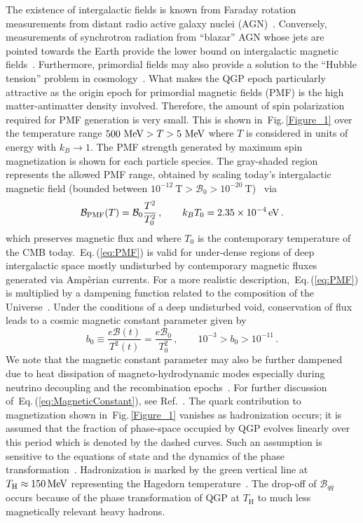 \documentclass[epjST]{svjour}
\newcommand*{\MeV}{\text{\,MeV}}
\newcommand*{\eV}{\text{\,eV}}
\newcommand{\req}[1]{Eq.\,(\ref{#1})}
\newcommand{\rf}[1]{Fig.\,{\ref{#1}}}
\begin{document}
{\color{blue} The existence of intergalactic fields is known from Faraday rotation measurements from distant radio active galaxy nuclei (AGN)~\cite{Pomakov:2022cem}. Conversely, measurements of synchrotron radiation from ``blazar'' AGN whose jets are pointed towards the Earth provide the lower bound on intergalactic magnetic fields~\cite{Neronov:2010gir}. Furthermore, primordial fields may also provide a solution to the ``Hubble tension'' problem in cosmology~\cite{Jedamzik:2025cax}. What makes the QGP epoch particularly attractive as the origin epoch for primordial magnetic fields (PMF) is the high matter-antimatter density involved. Therefore, the amount of spin polarization required for PMF generation is very small. This is shown in~\rf{Figure_1} over the temperature range \(500\,\MeV>T>5\,\MeV\) where \(T\) is considered in units of energy with \(k_{B}\to 1\). The PMF strength generated by maximum spin magnetization is shown for each particle species. The gray-shaded region represents the allowed PMF range, obtained by scaling today’s intergalactic magnetic field (bounded between \(10^{-12}~\mathrm{T} > \mathcal{B}_{0} > 10^{-20}~\mathrm{T}\))~\cite{Pshirkov:2015tua,Planck:2015zrl,Jedamzik:2018itu} via
\begin{equation}
\label{eq:PMF}
\mathcal{B}_\mathrm{PMF}(T) = \mathcal{B}_{0}\frac{T^{2}}{T_{0}^{2}}\,,\qquad
k_{B}T_{0} = 2.35\times10^{-4}\eV\,.
\end{equation}
which preserves magnetic flux and where \(T_{0}\) is the contemporary temperature of the CMB today.~\req{eq:PMF} is valid for under-dense regions of deep intergalactic space mostly undisturbed by contemporary magnetic fluxes generated via Amp{\`e}rian currents. For a more realistic description,~\req{eq:PMF} is multiplied by a dampening function related to the composition of the Universe~\cite{Banerjee:2004df}. Under the conditions of a deep undisturbed void, conservation of flux leads to a cosmic magnetic constant parameter given by
\begin{equation}
\label{eq:MagneticConstant}
b_{0} \equiv \frac{e\mathcal{B}(t)}{T^{2}(t)}=\frac{e\mathcal{B}_{0}}{T_{0}^{2}}\,,\qquad
10^{-3} > b_{0} > 10^{-11}\,.
\end{equation}
We note that the magnetic constant parameter may also be further dampened due to heat dissipation of magneto-hydrodynamic modes especially during neutrino decoupling and the recombination epochs~\cite{Jedamzik:1996wp}. For further discussion of~\req{eq:MagneticConstant}, see Ref.~\cite{Steinmetz:2023nsc}. The quark contribution to magnetization shown in~\rf{Figure_1} vanishes as hadronization occurs; it is assumed that the fraction of phase-space occupied by QGP evolves linearly over this period which is denoted by the dashed curves. Such an assumption is sensitive to the equations of state and the dynamics of the phase transformation~\cite{Fromerth:2012fe}.} Hadronization is marked by the green vertical line at \(T_\mathrm{H}\approx150\MeV\) {\color{blue}representing the Hagedorn temperature~\cite{Hagedorn:1967dia,Rafelski:2015xej}.} The drop-off of \(\mathcal{B}_{q\bar{q}}\) occurs because of the phase transformation of QGP at \(T_\mathrm{H}\) to much less magnetically relevant heavy hadrons.
\end{document}
